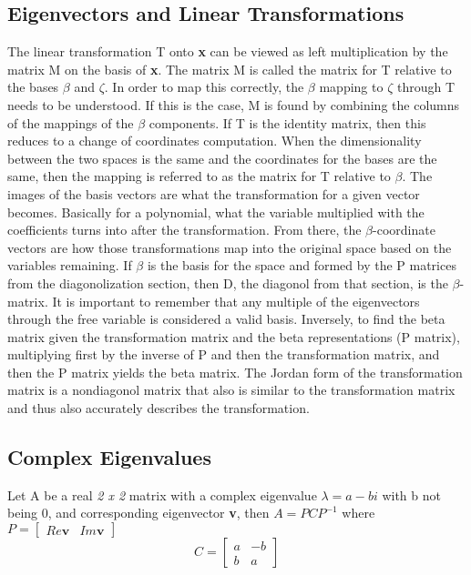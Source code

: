 \documentclass[12pt]{article}
\begin{document}
\subsection{Eigenvectors and Linear Transformations}
The linear transformation T onto \textbf{x} can be viewed as left multiplication by the matrix M on the basis of \textbf{x}. The matrix M is called the matrix for T relative to the bases 
$\beta$ and $\zeta$. In order to map this correctly, the $\beta$ mapping to $\zeta$ through T needs to be understood. If this is the case, M is found by combining the columns of 
the mappings of the $\beta$ components. If T is the identity matrix, then this reduces to a change of coordinates computation. When the dimensionality between the two spaces is the same 
and the coordinates for the bases are the same, then the mapping is referred to as the matrix for T relative to $\beta$. The images of the basis vectors are what the transformation for 
a given vector becomes. Basically for a polynomial, what the variable multiplied with the coefficients turns into after the transformation. From there, the $\beta$-coordinate vectors 
are how those transformations map into the original space based on the variables remaining. 
\newline
\newline
If $\beta$ is the basis for the space and formed by the P matrices from the diagonolization section, then D, the diagonol from that section, is the $\beta$-matrix. It is important to 
remember that any multiple of the eigenvectors through the free variable is considered a valid basis. Inversely, to find the beta matrix given the transformation matrix and the beta 
representations (P matrix), multiplying first by the inverse of P and then the transformation matrix, and then the P matrix yields the beta matrix. The Jordan form of the 
transformation matrix is a nondiagonol matrix that also is similar to the transformation matrix and thus also accurately describes the transformation. 
\subsection{Complex Eigenvalues}
Let A be a real \textit{2 x 2} matrix with a complex eigenvalue $\lambda = a-bi$ with b not being 0, and corresponding eigenvector \textbf{v}, then $A=PCP^{-1}$ where $P=\begin{bmatrix}
    Re{\mathbf{v}} & Im{\mathbf{v}}
\end{bmatrix}$
$$C=\begin{bmatrix}
    a & -b \\
    b & a
\end{bmatrix}$$
\end{document}
